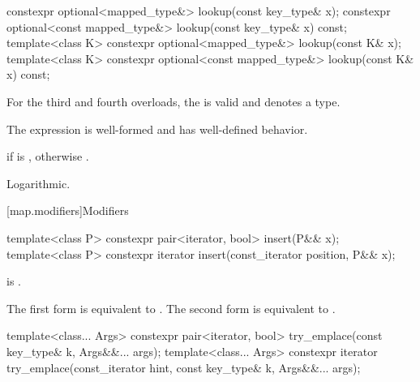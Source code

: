 %
\begin{itemdecl}
constexpr optional<mapped_type&>       lookup(const key_type& x);
constexpr optional<const mapped_type&> lookup(const key_type& x) const;
template<class K> constexpr optional<mapped_type&>       lookup(const K& x);
template<class K> constexpr optional<const mapped_type&> lookup(const K& x) const;
\end{itemdecl}

\begin{itemdescr}
\pnum
\constraints
For the third and fourth overloads,
the  
is valid and denotes a type.

\pnum
\expects
The expression  is well-formed and has well-defined behavior.

\pnum
\returns
{} if  is ,
otherwise .

\pnum
\complexity
Logarithmic.
\end{itemdescr}

[map.modifiers]{Modifiers}

%
\begin{itemdecl}
template<class P>
  constexpr pair<iterator, bool> insert(P&& x);
template<class P>
  constexpr iterator insert(const_iterator position, P&& x);
\end{itemdecl}

\begin{itemdescr}
\pnum
\constraints
{} is .

\pnum
\effects
The first form is equivalent to
. The second form is
equivalent to .
\end{itemdescr}

%
\begin{itemdecl}
template<class... Args>
  constexpr pair<iterator, bool> try_emplace(const key_type& k, Args&&... args);
template<class... Args>
  constexpr iterator try_emplace(const_iterator hint, const key_type& k, Args&&... args);
\end{itemdecl}

